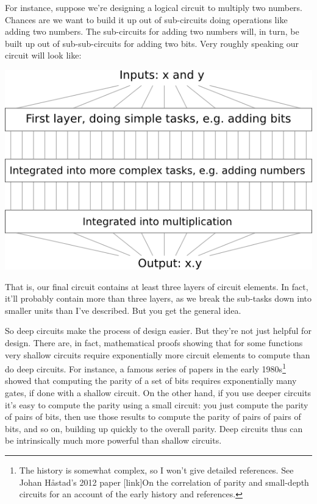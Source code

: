 \documentclass[a4paper,twoside,10pt]{book}
\begin{document}
For instance, suppose we're designing a logical circuit to multiply two numbers. Chances are we want to build it up out of sub-circuits doing operations like adding two numbers. The sub-circuits for adding two numbers will, in turn, be built up out of sub-sub-circuits for adding two bits. Very roughly speaking our circuit will look like:
\begin{center}
	\includegraphics[width=0.7\linewidth]{figures/ch5/circuit_multiplication}
\end{center}
That is, our final circuit contains at least three layers of circuit elements. In fact, it'll probably contain more than three layers, as we break the sub-tasks down into smaller units than I've described. But you get the general idea.

So deep circuits make the process of design easier. But they're not just helpful for design. There are, in fact, mathematical proofs showing that for some functions very shallow circuits require exponentially more circuit elements to compute than do deep circuits. For instance, a famous series of papers in the early 1980s\footnote{The history is somewhat complex, so I won't give detailed references. See Johan H\aa{}stad's 2012 paper [link]On the correlation of parity and small-depth circuits for an account of the early history and references.} showed that computing the parity of a set of bits requires exponentially many gates, if done with a shallow circuit. On the other hand, if you use deeper circuits it's easy to compute the parity using a small circuit: you just compute the parity of pairs of bits, then use those results to compute the parity of pairs of pairs of bits, and so on, building up quickly to the overall parity. Deep circuits thus can be intrinsically much more powerful than shallow circuits.
\end{document}

